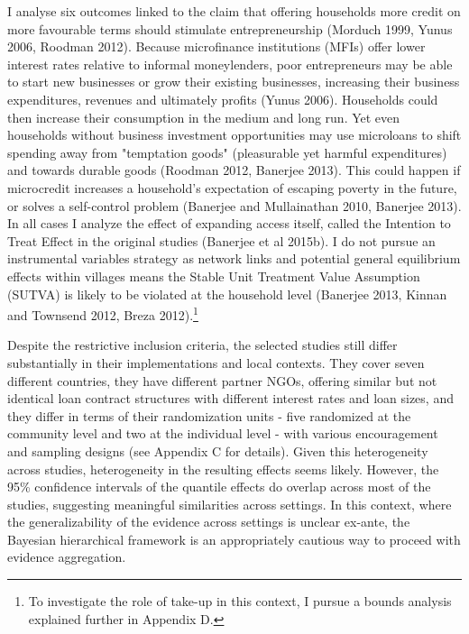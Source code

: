 \documentclass[english,12pt]{article}\usepackage{lmodern}
\numberwithin{equation}{section}
\begin{document}
I analyse six outcomes linked to the claim that offering households more credit on more favourable terms should stimulate entrepreneurship (Morduch 1999, Yunus 2006, Roodman 2012). Because microfinance institutions (MFIs) offer lower interest rates relative to informal moneylenders, poor entrepreneurs may be able to start new businesses or grow their existing businesses, increasing their business expenditures, revenues and ultimately profits (Yunus 2006). Households could then increase their consumption in the medium and long run. Yet even households without business investment opportunities may use microloans to shift spending away from "temptation goods" (pleasurable yet harmful expenditures) and towards durable goods (Roodman 2012, Banerjee 2013). This could happen if microcredit increases a household's expectation of escaping poverty in the future, or solves a self-control problem (Banerjee and Mullainathan 2010, Banerjee 2013). In all cases I analyze the effect of expanding access itself, called the Intention to Treat Effect in the original studies (Banerjee et al 2015b). I do not pursue an instrumental variables strategy as network links and potential general equilibrium effects within villages means the Stable Unit Treatment Value Assumption (SUTVA) is likely to be violated at the household level (Banerjee 2013, Kinnan and Townsend 2012, Breza 2012).\footnote{To investigate the role of take-up in this context, I pursue a bounds analysis explained further in Appendix D.}

Despite the restrictive inclusion criteria, the selected studies still differ substantially in their implementations and local contexts. They cover seven different countries, they have different partner NGOs, offering similar but not identical loan contract structures with different interest rates and loan sizes, and they differ in terms of their randomization units - five randomized at the community level and two at the individual level - with various encouragement and sampling designs (see Appendix C for details). Given this heterogeneity across studies, heterogeneity in the resulting effects seems likely. However, the 95\% confidence intervals of the quantile effects do overlap across most of the studies, suggesting meaningful similarities across settings. In this context, where the generalizability of the evidence across settings is unclear ex-ante, the Bayesian hierarchical framework is an appropriately cautious way to proceed with evidence aggregation.
\end{document}
